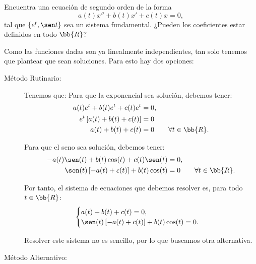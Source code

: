 \documentclass[12pt]{article}
\begin{document}
    \begin{ejercicio}
        Encuentra una ecuación de segundo orden de la forma
        \begin{equation*}
            a(t)x''+b(t)x'+c(t)x=0,
        \end{equation*}
        tal que $\{e^t,\sen t\}$ sea un sistema fundamental. ¿Pueden los coeficientes estar definidos en todo $\bb{R}$?

        Como las funciones dadas son ya linealmente independientes, tan solo tenemos que plantear que sean soluciones. 
        Para esto hay dos opciones:
        \begin{description}
            \item[Método Rutinario:]
            
            Tenemos que:
            Para que la exponencial sea solución, debemos tener:
            \begin{align*}
                a(t)e^t+b(t)e^t+c(t)e^t&=0,\\
                e^t\left[a(t)+b(t)+c(t)\right]&=0\\
                a(t)+b(t)+c(t)&=0\qquad \forall t\in\bb{R}.
            \end{align*}

            Para que el seno sea solución, debemos tener:
            \begin{align*}
                -a(t)\sen(t)+b(t)\cos(t)+c(t)\sen(t)&=0,\\
                \sen(t)\left[-a(t)+c(t)\right]+b(t)\cos(t)&=0\qquad \forall t\in\bb{R}.
            \end{align*}

            Por tanto, el sistema de ecuaciones que debemos resolver es, para todo $t\in\bb{R}$:
            \begin{equation*}
                \begin{cases}
                    a(t)+b(t)+c(t)=0,\\
                    \sen(t)\left[-a(t)+c(t)\right]+b(t)\cos(t)=0.
                \end{cases}
            \end{equation*}

            Resolver este sistema no es sencillo, por lo que buscamos otra alternativa. 

            \item[Método Alternativo:]
            

\end{description}
\end{ejercicio}
\end{document}
